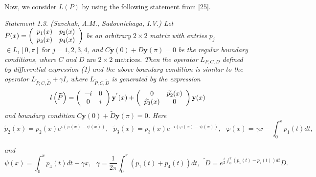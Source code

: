 \documentclass{article}%
\begin{document}
Now, we consider $L(P)$ by using the following statement from [25].

\textit{Statement 1.3. (Savchuk, A.M., Sadovnichaya, I.V.) Let }$P(x)=\left(
\begin{array}
[c]{cc}%
p_{1}(x) & p_{2}(x)\\
p_{3}(x) & p_{4}(x)
\end{array}
\right)  $\textit{ be an arbitrary }$2\times2$\textit{ matrix with entries
}$p_{j}$\textit{ }$\in L_{1}[0,\pi]$ for $j=1,2,3,4$\textit{, and
}$C\mathbf{y}(0)+D\mathbf{y}(\pi)=0$\textit{ be the regular boundary
conditions, where }$C$\textit{ and }$D$ are $2\times2$ matrices.\textit{ Then
the operator }$L_{P,C,D}$\textit{ defined by differential expression (1) and
the above boundary condition is similar to the operator }$L_{\widetilde
{P},C,\widetilde{D}}+\gamma I$\textit{, where }$L_{\widetilde{P}%
,C,\widetilde{D}}$ \textit{is generated by the expression}
\[
l\left(  \widetilde{P}\right)  =\left(
\begin{array}
[c]{cc}%
-i & 0\\
0 & i
\end{array}
\right)  \mathbf{y}^{^{\prime}}(x)+\left(
\begin{array}
[c]{cc}%
0 & \widetilde{p_{2}}(x)\\
\widetilde{p_{3}}(x) & 0
\end{array}
\right)  \mathbf{y}(x)
\]
\textit{and boundary condition} $C\mathbf{y}(0)+\widetilde{D}\mathbf{y}%
(\pi)=0$\textit{.} \textit{Here}%
\[
\widetilde{p}_{2}(x)=p_{2}(x)e^{i(\varphi(x)-\psi(x))},\text{ }\widetilde
{p}_{3}(x)=p_{3}(x)e^{-i(\varphi(x)-\psi(x))},\text{ }\varphi(x)=\gamma
x-\int_{0}^{x}p_{1}(t)dt,
\]


\textit{and}
\[
\psi(x)=\int_{0}^{x}p_{4}(t)dt-\gamma x,\text{ \ }\gamma=\frac{1}{2\pi}%
\int_{0}^{\pi}\left(  p_{1}(t)+p_{4}(t)\right)  dt,\widetilde{\text{ }%
D}=e^{\frac{i}{2}\int_{0}^{\pi}\left(  p_{1}(t)-p_{4}(t)\right)  dt}D.
\]
\end{document}
